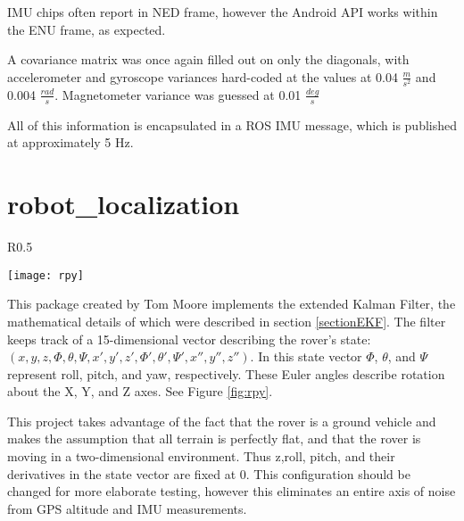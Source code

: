 IMU chips often report in NED frame, however the Android API works within the ENU frame, as expected.

A covariance matrix was once again filled out on only the diagonals, with accelerometer and gyroscope variances hard-coded at the values at 0.04 \(\frac{m}{s^2}\) and 0.004 \(\frac{rad}{s}\). \cite{Nexus4Paper}
Magnetometer variance was guessed at 0.01 \(\frac{deg}{s}\)

All of this information is encapsulated in a ROS IMU message, which is published at approximately 5 Hz. 

\section{robot\_localization} \label{sectionRobotLocalization}

\begin{wrapfigure}{R}{0.5\textwidth} 
	\caption{Roll, Pitch, and Yaw \cite{fig_rpy}}
	\label{fig:rpy}
	\centering
	\texttt{[image: rpy]}
\end{wrapfigure}

This package created by Tom Moore implements the extended Kalman Filter, the mathematical details of which were described in section \ref{sectionEKF}. The filter keeps track of a 15-dimensional vector describing the rover's state: \((x,y,z,\Phi,\theta,\Psi,x',y',z',\Phi ',\theta ',\Psi ', x'', y'', z'')\). In this state vector  \(\Phi\), \(\theta\), and \(\Psi\) represent roll, pitch, and yaw, respectively. These Euler angles describe rotation about the X, Y, and Z axes. See Figure \ref{fig:rpy}. \cite{robot_localization_paper}

This project takes advantage of the fact that the rover is a ground vehicle and makes the assumption that all terrain is perfectly flat, and that the rover is moving in a two-dimensional environment. Thus z,roll, pitch, and their derivatives in the state vector are fixed at 0. This configuration should be changed for more elaborate testing, however this eliminates an entire axis of noise from GPS altitude and IMU measurements. 

